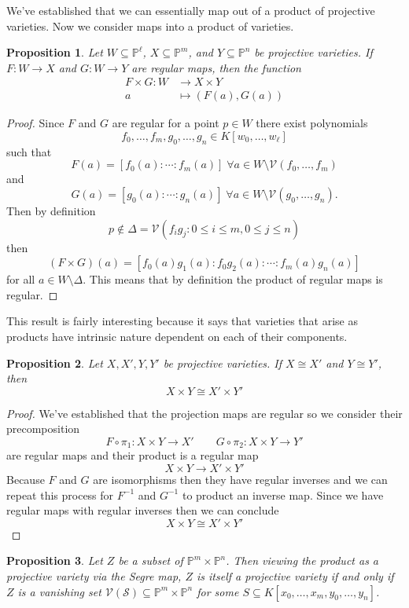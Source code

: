 \documentclass[40pt]{article}
\newcommand{\mcal}[1]{\mathcal{#1}}
\newcommand{\Proj}{\mathbb{P}}
\newcommand{\V}{\mathcal{V}}
\newtheorem{proposition}{Proposition}[section]
\theoremstyle{remark}
\begin{document}
			We've established that we can essentially map out of a product of projective varieties. Now we consider maps into a product of varieties. 
			\begin{proposition}
				Let $W \subseteq \Proj^\ell$, $X \subseteq \Proj^m$, and $Y \subseteq \Proj^n$ be projective varieties. If $F : W \rightarrow X$ and $G : W \rightarrow Y$ are regular maps, then the function 
				\begin{align}
					F \times G : W &\to X \times Y \\
					a &\mapsto (F(a), G(a))
				\end{align}
			\end{proposition}
			\begin{proof}
				Since $F$ and $G$ are regular for a point $p \in W$ there exist polynomials 
				\[
				f_0,\dots,f_m, g_0,\dots,g_n \in K[w_0,\dots,w_\ell]
				\]
				such that 
				\[
				F(a) = [f_0(a): \cdots : f_m(a)] \; \forall a \in W \setminus \V(f_0,\dots,f_m)
				\]
				and
				\[
				G(a) = [g_0(a): \cdots: g_n(a)] \; \forall a \in W \setminus \V(g_0,\dots,g_n).
				\]
				Then by definition 
				\[
				p \not \in \Delta = \V(f_ig_j : 0 \leq i \leq m , 0 \leq j \leq n)
				\]
				then 
				\[
				(F\times G)(a) = [f_0(a)g_1(a) : f_0g_2(a) : \cdots : f_m(a)g_n(a)]
				\]
				for all $a \in W \setminus\Delta$. This means that by definition the product of regular maps is regular.  
			\end{proof}
			This result is fairly interesting because it says that varieties that arise as products have intrinsic nature dependent on each of their components.
			\begin{proposition}
				Let $X,X',Y,Y'$ be projective varieties. If $X \cong X'$ and $Y \cong Y'$, then 
				\[
				X \times Y \cong X' \times Y'
				\]
			\end{proposition}
			\begin{proof}
				We've established that the projection maps are regular so we consider their precomposition
				\[
				F \circ \pi_1 : X \times Y \to X' \quad\quad G \circ \pi_2 : X \times Y \to Y'
				\]
				are regular maps and their product is a regular map
				\[
				X \times Y \to X' \times Y'
				\]
				Because $F$ and $G$ are isomorphisms then they have regular inverses and we can repeat this process for $F^{-1}$ and $G^{-1}$ to product an inverse map. Since we have regular maps with regular inverses then we can conclude 
				\[
				X \times Y \cong X'\times Y'
				\]
			\end{proof}
			\begin{proposition}
				Let $Z$ be a subset of $\Proj^m \times \Proj^n$. Then viewing the product as a projective variety via the Segre map, $Z$ is itself a projective variety if and only if $Z$ is a vanishing set $\V(\mcal{S}) \subseteq \Proj^m \times \Proj^n$ for some $S \subseteq K[x_0,\dots,x_m,y_0,\dots,y_n]$.
			\end{proposition}
\end{document}
